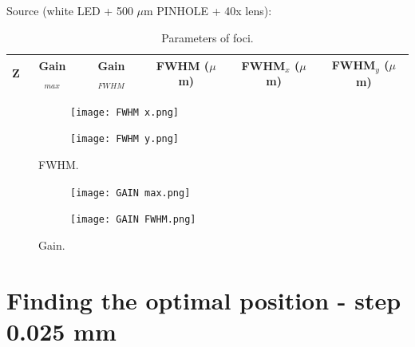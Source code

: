 \documentclass{article}
\begin{document}
Source (white LED + 500 $\mu$m PINHOLE + 40x lens):
\begin{table}[h]
    \centering
    \begin{tabular}{c c c c c c}
  	Z & Gain$_{max}$ & Gain$_{FWHM}$ & FWHM ($\mu$m) & FWHM$_x$ ($\mu$m) &FWHM$_y$ ($\mu$m)\\
  	\hline
  	\hline


\end{tabular}
 \caption{Parameters of foci.}
\label{tab:01}
\end{table}

\begin{figure}[h!]
\begin{center}
    \begin{subfigure}[b]{0.4\textwidth}
	\centering
      \texttt{[image: FWHM x.png]}
      \label{fig:02x}
    \end{subfigure}
    \begin{subfigure}[b]{0.4\textwidth}
	\centering
      \texttt{[image: FWHM y.png]}
      \label{fig:02y}
    \end{subfigure}
  	\caption{FWHM.}
    \begin{subfigure}[b]{0.4\textwidth}
	\centering
      \texttt{[image: GAIN max.png]}
      \label{fig:03max}
    \end{subfigure}
    \begin{subfigure}[b]{0.4\textwidth}
	\centering
      \texttt{[image: GAIN FWHM.png]}
      \label{fig:03}
    \end{subfigure}
  	\caption{Gain.}
\end{center}
\end{figure}

\clearpage
\newpage

\section{Finding the optimal position - step 0.025 mm}
\end{document}
